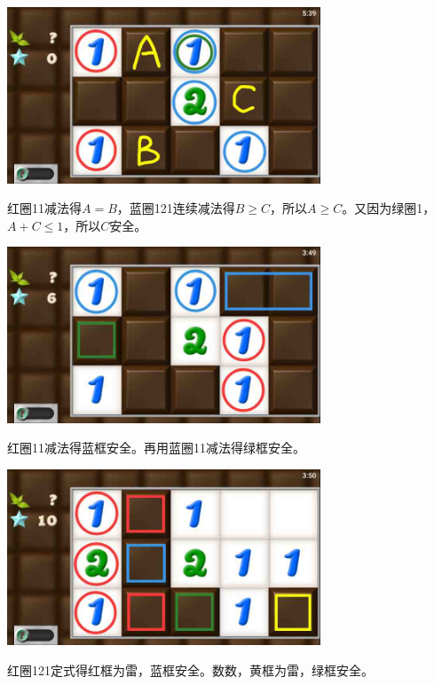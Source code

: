 \subsection{} %
\begin{center}
    \includegraphics[width=0.7\textwidth]{puzzlelow/96-1.jpg}
\end{center}
红圈11减法得$A=B$，蓝圈121连续减法得$B\ge C$，所以$A\ge C$。又因为绿圈1，$A+C\le 1$，所以$C$安全。
\begin{center}
    \includegraphics[width=0.7\textwidth]{puzzlelow/96-2.jpg}
\end{center}
红圈11减法得蓝框安全。再用蓝圈11减法得绿框安全。
\begin{center}
    \includegraphics[width=0.7\textwidth]{puzzlelow/96-3.jpg}
\end{center}
红圈121定式得红框为雷，蓝框安全。数数，黄框为雷，绿框安全。

